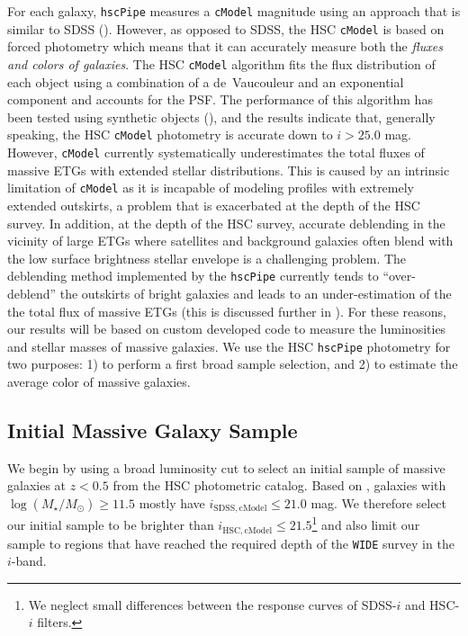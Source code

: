 \documentclass[a4paper,fleqn,usenatbib]{mnras}
\def\cmodel{\texttt{cModel}}
\def\logms{{$\log (M_{\star}/M_{\odot})$}}
\begin{document}
    For each galaxy, \texttt{hscPipe} measures a \cmodel{} magnitude using an approach 
    that is similar to SDSS (\citealt{BoschInPrep}). 
    However, as opposed to SDSS, the HSC \cmodel{} is based on forced photometry which 
    means that it can accurately measure both the \textit{fluxes and colors of galaxies}. 
    The HSC \cmodel{} algorithm fits the flux distribution of each object using a 
    combination of a de~Vaucouleur and an exponential component and accounts for the PSF. 
    The performance of this algorithm has been tested using synthetic objects 
    (\citealt{SynPipeInPrep}), and the results indicate that, generally speaking, 
    the HSC \cmodel{} photometry is accurate down to $i >25.0$ mag.  
    However, \cmodel{} currently systematically underestimates the total fluxes of 
    massive ETGs with extended stellar distributions. 
    This is caused by an intrinsic limitation of \cmodel{} as it is incapable of
    modeling profiles with extremely extended outskirts, a problem that is exacerbated 
    at the depth of the HSC survey. 
    In addition, at the depth of the HSC survey, accurate deblending in the vicinity of
    large ETGs where satellites and background galaxies often blend with the low surface 
    brightness stellar envelope is a challenging problem. 
    The deblending method implemented by the \texttt{hscPipe} currently tends to 
    ``over-deblend'' the outskirts of bright galaxies and leads to an 
    under-estimation of the the total flux of massive ETGs (this is discussed further in 
    \citealt{BoschInPrep}).  
    For these reasons, our results will be based on custom developed code to measure 
    the luminosities and stellar masses of massive galaxies. 
    We use the HSC \texttt{hscPipe} photometry for two purposes: 
    1) to perform a first broad sample selection, and 2) to estimate the average 
    color of massive galaxies.
    
\subsection{Initial Massive Galaxy Sample}
    \label{ssec:initial}
    
    We begin by using a broad luminosity cut to select an initial sample of massive 
    galaxies at $z < 0.5$ from the HSC photometric catalog. 
    Based on \citep{Leauthaud2016}, galaxies with \logms{}$\geq 11.5$ mostly have 
    $i_{\mathrm{SDSS, cModel}} \leq 21.0$ mag. 
    We therefore select our initial sample to be brighter than 
    $i_{\mathrm{HSC, cModel}} \leq 21.5$\footnote{We neglect small differences between 
    the response curves of SDSS-$i$ and HSC-$i$ filters.} 
    and also limit our sample to regions that have reached the required depth of 
    the \texttt{WIDE} survey in the $i$-band.
    
\end{document}
